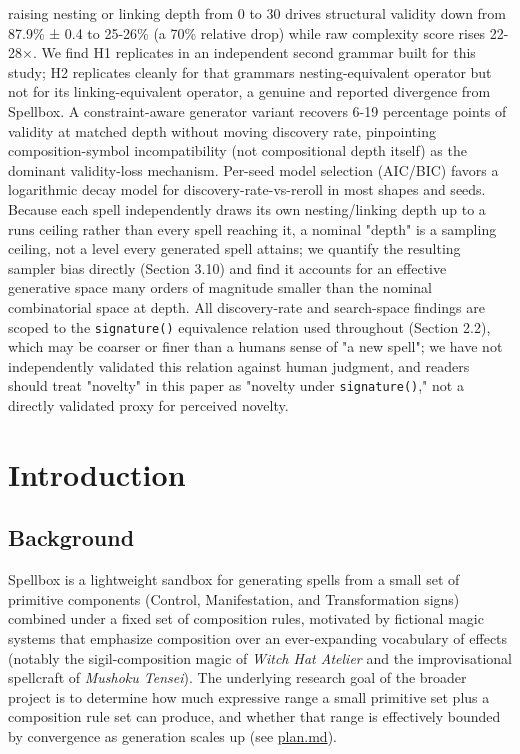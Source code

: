 \documentclass[
  10pt,
  twocolumn]{article}
\begin{document}
raising nesting or linking depth from 0 to 30 drives structural validity
down from 87.9\% ± 0.4 to 25-26\% (a 70\% relative drop) while raw
complexity score rises 22-28×. We find H1 replicates in an independent
second grammar built for this study; H2 replicates cleanly for that
grammar\textquotesingle s nesting-equivalent operator but not for its
linking-equivalent operator, a genuine and reported divergence from
Spellbox. A constraint-aware generator variant recovers 6-19 percentage
points of validity at matched depth without moving discovery rate,
pinpointing composition-symbol incompatibility (not compositional depth
itself) as the dominant validity-loss mechanism. Per-seed model
selection (AIC/BIC) favors a logarithmic decay model for
discovery-rate-vs-reroll in most shapes and seeds. Because each spell
independently draws its own nesting/linking depth up to a
run\textquotesingle s ceiling rather than every spell reaching it, a
nominal "depth" is a sampling ceiling, not a level every generated spell
attains; we quantify the resulting sampler bias directly (Section 3.10)
and find it accounts for an effective generative space many orders of
magnitude smaller than the nominal combinatorial space at depth. All
discovery-rate and search-space findings are scoped to the
\texttt{signature()} equivalence relation used throughout (Section 2.2),
which may be coarser or finer than a human\textquotesingle s sense of "a
new spell"; we have not independently validated this relation against
human judgment, and readers should treat "novelty" in this paper as
"novelty under \texttt{signature()}," not a directly validated proxy for
perceived novelty.

\section{Introduction}\label{introduction}

\subsection{Background}\label{background}

Spellbox is a lightweight sandbox for generating spells from a small set
of primitive components (Control, Manifestation, and Transformation
signs) combined under a fixed set of composition rules, motivated by
fictional magic systems that emphasize composition over an
ever-expanding vocabulary of effects (notably the sigil-composition
magic of \emph{Witch Hat Atelier} and the improvisational spellcraft of
\emph{Mushoku Tensei}). The underlying research goal of the broader
project is to determine how much expressive range a small primitive set
plus a composition rule set can produce, and whether that range is
effectively bounded by convergence as generation scales up (see
\href{../plan.md}{plan.md}).
\end{document}
